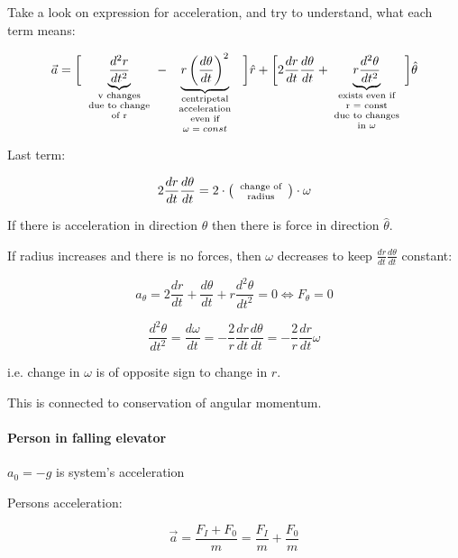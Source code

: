\subsection{}

Take a look on expression for acceleration, and try to understand, what each term means:

$$\vec{a} = \bigg[\underbrace{\frac{d^2 r}{dt^2}}_{\parbox{2cm}{\scriptsize  \centering v changes \\ due to change of r } } -  \underbrace{r \left(\frac{d\theta}{dt}\right)^2}_{\parbox{2cm}{\scriptsize  \centering centripetal \\ acceleration \\ even if $\omega = const$ }}  \bigg]\hat{r} + \bigg[ 2 \frac{dr}{dt}\frac{d\theta}{dt} +   \underbrace{r\frac{d^2\theta}{dt^2}}_{\parbox{2cm}{\scriptsize  \centering exists even if \\ r = const \\ due to changes \\ in $\omega$}}  \bigg]\hat{\theta}$$

Last term:

$$2 \frac{dr}{dt}\frac{d\theta}{dt} = 2 \cdot \left(\parbox{1.5cm}{\scriptsize  \centering change of \\ radius}\right) \cdot \omega$$

If there is acceleration in direction $\theta$ then there is force in direction $\hat{\theta}$.

If radius increases and there is no forces, then $\omega$ decreases to keep $\frac{dr}{dt}\frac{d\theta}{dt}$ constant:

$$a_\theta = 2 \frac{dr}{dt} + \frac{d\theta}{dt} + r \frac{d^2\theta}{dt^2} = 0 \iff F_\theta = 0$$

$$ \frac{d^2\theta}{dt^2} = \frac{d\omega}{dt} = -\frac{2}{r} \frac{dr}{dt}\frac{d\theta}{dt} = -\frac{2}{r}\frac{dr}{dt}\omega  $$

i.e. change in $\omega$ is of opposite sign to change in $r$.

This is connected to conservation of angular momentum.


\paragraph{Person in falling elevator}

$a_0 = -g$ is system's acceleration

Persons acceleration:

$$\vec{a} = \frac{F_I + F_0}{m} = \frac{F_I}{m} + \frac{F_0}{m}$$


